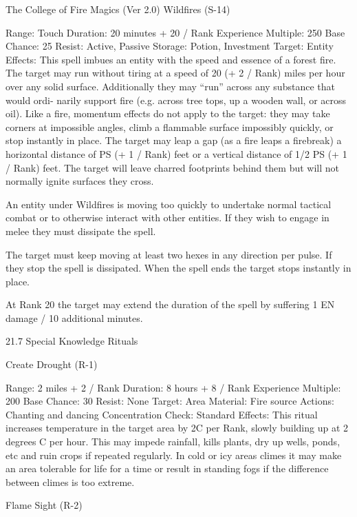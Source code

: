 \begin{Chapter}{The College of Fire Magics (Ver 2.0)}
Wildfires (S-14) 

Range: Touch 
Duration: 20 minutes + 20 / Rank 
Experience Multiple: 250 
Base Chance: 25%
Resist: Active, Passive 
Storage: Potion, Investment 
Target: Entity 
Effects: This spell imbues an entity with the speed 
and  essence  of  a  forest  fire.  The  target  may  run 
without  tiring  at  a  speed  of  20  (+  2  /  Rank)  miles 
per  hour  over  any  solid  surface.  Additionally  they 
may  “run”  across  any  substance  that  would  ordi-
narily  support  fire  (e.g.  across  tree  tops,  up  a 
wooden wall, or across oil). Like a fire, momentum 
effects  do  not  apply  to  the  target:  they  may  take 
corners  at  impossible  angles,  climb  a  flammable 
surface  impossibly  quickly,  or  stop  instantly  in 
place. The target may  leap a gap (as a fire  leaps a 
firebreak) a horizontal distance of PS (+ 1 / Rank) 
feet  or  a  vertical  distance  of  1/2  PS  (+  1  /  Rank) 
feet. The target will leave charred footprints behind 
them  but  will  not  normally  ignite  surfaces  they 
cross. 

An entity under Wildfires is moving too quickly to 
undertake  normal  tactical  combat  or  to  otherwise 
interact  with  other  entities.  If  they  wish  to  engage 
in melee they must dissipate the spell. 

The target must keep moving at least two hexes in 
any  direction  per  pulse.  If  they  stop  the  spell  is 
dissipated.  When  the  spell  ends  the  target  stops 
instantly in place. 

At  Rank  20  the  target  may  extend  the  duration  of 
the spell by suffering 1 EN damage / 10 additional 
minutes. 

21.7 Special Knowledge Rituals 

Create Drought (R-1) 

Range: 2 miles + 2 / Rank 
Duration: 8 hours + 8 / Rank 
Experience Multiple: 200 
Base Chance: 30%
Resist: None 
Target: Area 
Material: Fire source 
Actions: Chanting and dancing 
Concentration Check: Standard 
Effects:  This  ritual  increases  temperature  in  the 
target area by 2C per Rank, slowly building up at 2 
degrees C per hour. This may impede rainfall, kills 
plants,  dry  up  wells,  ponds,  etc  and  ruin  crops  if 
repeated  regularly.  In  cold  or  icy  areas  climes  it 
may  make  an  area  tolerable  for  life  for  a  time  or 
result  in  standing  fogs  if  the  difference  between 
climes is too extreme. 

Flame Sight (R-2) 


\end{Chapter}
